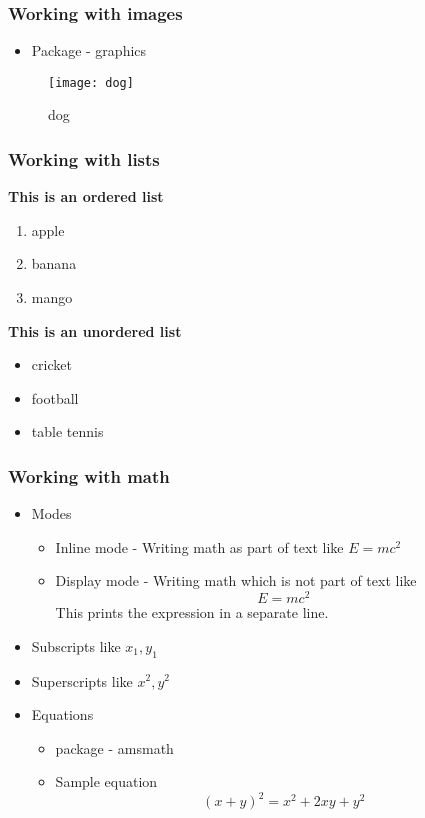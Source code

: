 \documentclass{beamer}
\begin{document}
\begin{frame}
\frametitle{Working with images}
\begin{itemize}
\item Package - graphics
\end{itemize}
\begin{figure}
\texttt{[image: dog]}
\caption{dog}
\end{figure}
\end{frame}
\begin{frame}
\frametitle{Working with lists}
\textbf{This is an ordered list}
\begin{enumerate}
\item apple
\item banana
\item mango
\end{enumerate}
\textbf{This is an unordered list}
\begin{itemize}
\item cricket
\item football
\item table tennis
\end{itemize}
\end{frame}
\begin{frame}
\frametitle{Working with math}
\begin{itemize}
\item Modes
\begin{itemize}
\item Inline mode - Writing math as part of text like $E=mc^2$
\item Display mode - Writing math which is not part of text like $$E=mc^2$$ This prints the expression in a separate line.
\end{itemize}
\item Subscripts like $x_1, y_1$
\item Superscripts like $x^2, y^2$
\item Equations
\begin{itemize}
\item package - amsmath
\item Sample equation
\begin{equation}
(x+y)^2 = x^2 + 2xy + y^2
\end{equation}
\end{itemize}
\end{itemize}
\end{frame}
\end{document}
